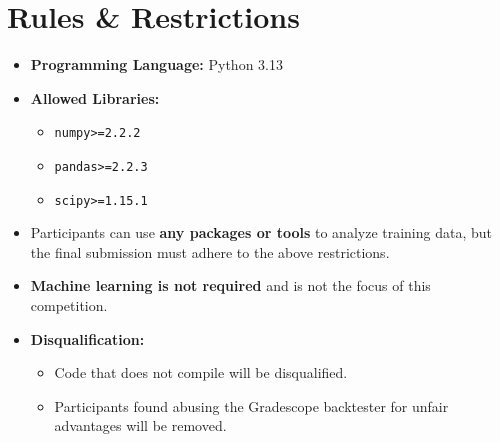 \documentclass{article}
\begin{document}
\section{Rules \& Restrictions}
\begin{itemize}
    \item \textbf{Programming Language:} Python 3.13
    \item \textbf{Allowed Libraries:}
    \begin{itemize}
        \item \texttt{numpy>=2.2.2}
        \item \texttt{pandas>=2.2.3}
        \item \texttt{scipy>=1.15.1}
    \end{itemize}
    \item Participants can use \textbf{any packages or tools} to analyze training data, but the final submission must adhere to the above restrictions.
    \item \textbf{Machine learning is not required} and is not the focus of this competition.
    \item \textbf{Disqualification:}
    \begin{itemize}
        \item Code that does not compile will be disqualified.
        \item Participants found abusing the Gradescope backtester for unfair advantages will be removed.
    \end{itemize}
\end{itemize}
\end{document}
